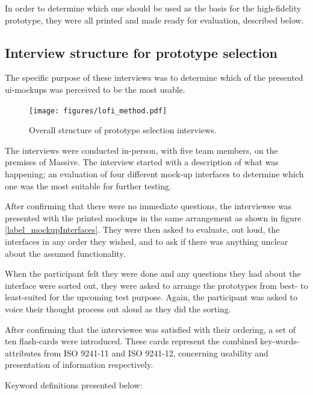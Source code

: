{  In order to determine which one should be used as the
  basis for the high-fidelity prototype, they were all printed and made ready
  for evaluation, described below.

  \subsection{Interview structure for prototype selection}

    The specific purpose of these interviews was to determine which of the
    presented ui-mockups was perceived to be the most usable.

    \begin{figure}[h!]
      \centering
      \texttt{[image: figures/lofi\_method.pdf]}
      \caption{Overall structure of prototype selection interviews.}
    \end{figure}

    The interviews were conducted in-person, with five team members, on
    the premises of Massive. The interview started with a description of
    what was happening; an evaluation of four different mock-up interfaces
    to determine which one was the most suitable for further testing.

    After confirming that there were no immediate questions, the
    interviewee was presented with the printed mockups in the same
    arrangement as shown in figure \ref{label_mockupInterfaces}. They were
    then asked to evaluate, out loud, the interfaces in any order they
    wished, and to ask if there was anything unclear about the assumed
    functionality.

    When the participant felt they were done and any questions they had
    about the interface were sorted out, they were asked to arrange the
    prototypes from best- to least-suited for the upcoming test purpose.
    Again, the participant was asked to voice their thought process out
    aloud as they did the sorting.

    After confirming that the interviewee was satisfied with their ordering, a
    set of ten flash-cards were introduced. These cards represent the combined
    key-words-attributes from ISO 9241-11\cite{citeISO9241} and ISO
    9241-12\cite{citeISO9241-12}, concerning usability and presentation of
    information respectively.

    Keyword definitions presented below:

}
